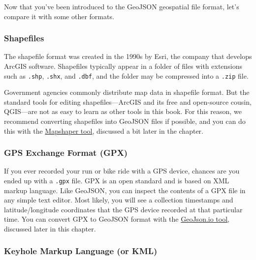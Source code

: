 \documentclass[
  english,
]{book}
\begin{document}
Now that you've been introduced to the GeoJSON geospatial file format, let's compare it with some other formats.

\hypertarget{shapefiles}{%
\subsubsection*{Shapefiles}\label{shapefiles}}

The shapefile format was created in the 1990s by Esri, the company that develops
ArcGIS software. Shapefiles typically appear in a folder of files with extensions
such as \texttt{.shp}, \texttt{.shx}, and \texttt{.dbf}, and the folder may be compressed into a \texttt{.zip} file.

Government agencies commonly distribute map data in shapefile format. But the standard tools for editing
shapefiles---ArcGIS and its free and open-source cousin, QGIS---are not as
easy to learn as other tools in this book. For this reason, we
recommend converting shapefiles into GeoJSON files if possible, and you can do this with the \href{mapshaper.html}{Mapshaper tool}, discussed a bit later in the chapter.

\hypertarget{gps-exchange-format-gpx}{%
\subsubsection*{GPS Exchange Format (GPX)}\label{gps-exchange-format-gpx}}

If you ever recorded your run or bike ride with a GPS device, chances are you ended up with a \texttt{.gpx} file.
GPX is an open standard and is based on XML markup language.
Like GeoJSON, you can inspect the contents of a GPX file in any simple text editor. Most likely, you will see a collection timestamps and latitude/longitude coordinates that the GPS device recorded at that particular time. You can convert GPX to GeoJSON format with the \href{geojsonio.html}{GeoJson.io tool}, discussed later in this chapter.

\hypertarget{keyhole-markup-language-or-kml}{%
\subsubsection*{Keyhole Markup Language (or KML)}\label{keyhole-markup-language-or-kml}}
\end{document}
